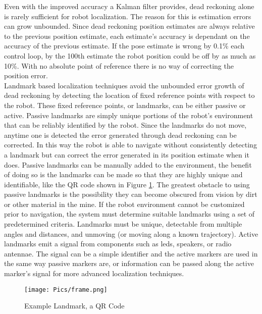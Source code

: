 Even with the improved accuracy a Kalman filter provides, dead reckoning alone is rarely sufficient for robot localization. The reason for this is estimation errors can grow unbounded. Since dead reckoning position estimates are always relative to the previous position estimate, each estimate's accuracy is dependant on the accuracy of the previous estimate. If the pose estimate is wrong by 0.1\% each control loop, by the 100th estimate the robot position could be off by as much as 10\%. With no absolute point of reference there is no way of correcting the position error.\\

Landmark based localization techniques avoid the unbounded error growth of dead reckoning by detecting the location of fixed reference points with respect to the robot. These fixed reference points, or landmarks, can be either passive or active. Passive landmarks are simply unique portions of the robot's environment that can be reliably identified by the robot. Since the landmarks do not move, anytime one is detected the error generated through dead reckoning can be corrected. In this way the robot is able to navigate without consistently detecting a landmark but can correct the error generated in its position estimate when it does. Passive landmarks can be manually added to the environment, the benefit of doing so is the landmarks can be made so that they are highly unique and identifiable, like the QR code shown in Figure \ref{fig:qr}. The greatest obstacle to using passive landmarks is the possibility they can become obscured from vision by dirt or other material in the mine. If the robot environment cannot be customized prior to navigation, the system must determine suitable landmarks using a set of predetermined criteria. Landmarks must be unique, detectable from multiple angles and distances, and unmoving (or moving along a known trajectory). Active landmarks emit a signal from components such as \acrshort{led}s, speakers, or radio antennae. The signal can be a simple identifier and the active markers are used in the same way passive markers are, or information can be passed along the active marker's signal for more advanced localization techniques.\\

\begin{figure}[h]
    \centering
    \texttt{[image: Pics/frame.png]}
    \caption{Example Landmark, a QR Code}
    \label{fig:qr}
\end{figure}

